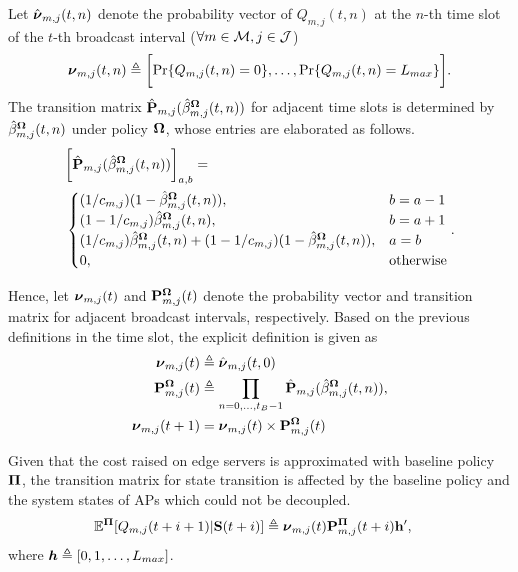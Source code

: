 Let $\hat{\boldsymbol{\nu}}_{m,j}(t,n)$ denote the probability vector of $Q_{m,j}(t,n)$ at the $n$-th time slot of the $t$-th broadcast interval ($\forall m\in\mathcal{M}, j\in\mathcal{J}$)
{\small
\begin{align}
    \vecG{\nu}_{m,j}(t,n) \define \Bracket{
        \Pr\{Q_{m,j}(t,n)=0\}, \dots, \Pr\{Q_{m,j}(t,n)=L_{max}\}
    }.
\end{align}
}The transition matrix $\hat{\mathbf{P}}_{m,j}(\hat{\beta}^{\boldsymbol{\Omega}}_{m,j}(t,n))$ for adjacent time slots is determined by $\hat{\beta}^{\boldsymbol{\Omega}}_{m,j}(t,n)$ under policy $\boldsymbol{\Omega}$, whose entries are elaborated as follows.
{\small
\begin{align}
    &\bigg[ \hat{\mathbf{P}}_{m,j}(\hat{\beta}^{\boldsymbol{\Omega}}_{m,j}(t,n)) \bigg]_{a,b} =
    \nonumber\\
    &\begin{cases}
        (1/c_{m,j})(1-\hat{\beta}^{\boldsymbol{\Omega}}_{m,j}(t,n)), & b=a-1 \\
        (1-1/c_{m,j})\hat{\beta}^{\boldsymbol{\Omega}}_{m,j}(t,n), & b=a+1 \\
        (1/c_{m,j})\hat{\beta}^{\boldsymbol{\Omega}}_{m,j}(t,n) + (1-1/c_{m,j})(1-\hat{\beta}^{\boldsymbol{\Omega}}_{m,j}(t,n)), & a=b \\
        0, &\text{otherwise}
    \end{cases}.
\end{align}
}

Hence, let $\boldsymbol{\nu}_{m,j}(t)$ and $\mathbf{P}^{\boldsymbol{\Omega}}_{m,j}(t)$ denote the probability vector and transition matrix for adjacent broadcast intervals, respectively.
Based on the previous definitions in the time slot, the explicit definition is given as
\begin{align}
    \boldsymbol{\nu}_{m,j}(t) &\triangleq \hat{\boldsymbol{\nu}}_{m,j}(t,0)
    \\
    \mathbf{P}^{\boldsymbol{\Omega}}_{m,j}(t) &\triangleq \prod_{n=0,\dots,t_B-1} \hat{\mathbf{P}}_{m,j}(\hat{\beta}^{\boldsymbol{\Omega}}_{m,j}(t,n)),
    \\
    \boldsymbol{\nu}_{m,j}(t+1) &= \boldsymbol{\nu}_{m,j}(t) \times \mathbf{P}^{\boldsymbol{\Omega}}_{m,j}(t)
\end{align}

Given that the cost raised on edge servers is approximated with baseline policy $\boldsymbol{\Pi}$, the transition matrix for state transition is affected by the baseline policy and the system states of APs which could not be decoupled.
\begin{align}
    \mathbb{E}^{\boldsymbol{\Pi}}[ Q_{m,j}({t+i+1}) | \mathbf{S}(t+i)] &\triangleq
        \boldsymbol{\nu}_{m,j}(t) \mathbf{P}^{\boldsymbol{\Pi}}_{m,j}(t+i) \mathbf{h}',
\end{align}
where $\boldsymbol{h} \triangleq [0,1,\dots,L_{max}]$.

